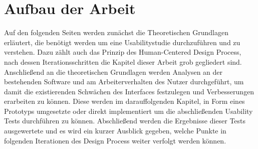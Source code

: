\section{Aufbau der Arbeit}
Auf den folgenden Seiten werden zunächst die Theoretischen Grundlagen erläutert, die benötigt werden um eine Usabilitystudie durchzuführen und zu verstehen.
Dazu zählt auch das Prinzip des Human-Centered Design Process, nach dessen Iterationsschritten die Kapitel dieser Arbeit grob gegliedert sind.
Anschließend an die theoretischen Grundlagen werden Analysen an der bestehenden Software und am Arbeiterverhalten des Nutzer durchgeführt, um damit die existierenden Schwächen des Interfaces festzulegen und Verbesserungen erarbeiten zu können.
Diese werden im darauffolgenden Kapitel, in Form eines Prototyps umgesetzte oder direkt implementiert um die abschließenden Usability Tests durchführen zu können.
Abschließend werden die Ergebnisse dieser Tests ausgewertete und es wird ein kurzer Ausblick gegeben, welche Punkte in folgenden Iterationen des Design Process weiter verfolgt werden können.
